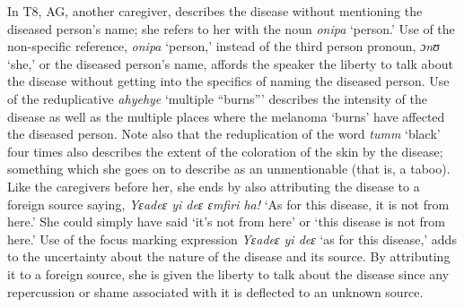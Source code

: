 \documentclass[output=paper,colorlinks,citecolor=brown]{langscibook}
\begin{document}
In T8, AG, another caregiver, describes the disease without mentioning the diseased person’s name; she refers to her with the noun \textit{onipa} ‘person.’ Use of the non-specific reference, \textit{onipa} ‘person,’ instead of the third person pronoun, \textit{ɔnʊ} ‘she,’ or the diseased person’s name, affords the speaker the liberty to talk about the disease without getting into the specifics of naming the diseased person. Use of the reduplicative \textit{ahyehye} ‘multiple “burns”’ describes the intensity of the disease as well as the multiple places where the melanoma ‘burns’ have affected the diseased person. Note also that the reduplication of the word \textit{tumm} ‘black’ four times also describes the extent of the coloration of the skin by the disease; something which she goes on to describe as an unmentionable (that is, a taboo). Like the caregivers before her, she ends by also attributing the disease to a foreign source saying, \textit{Yɛadeɛ yi deɛ ɛmfiri ha!} ‘As for this disease, it is not from here.’ She could simply have said ‘it’s not from here’ or ‘this disease is not from here.’ Use of the focus marking expression \textit{Yɛadeɛ yi deɛ}  ‘as for this disease,’ adds to the uncertainty about the nature of the disease and its source. By attributing it to a foreign source, she is given the liberty to talk about the disease since any repercussion or shame associated with it is deflected to an unknown source.
\end{document}
